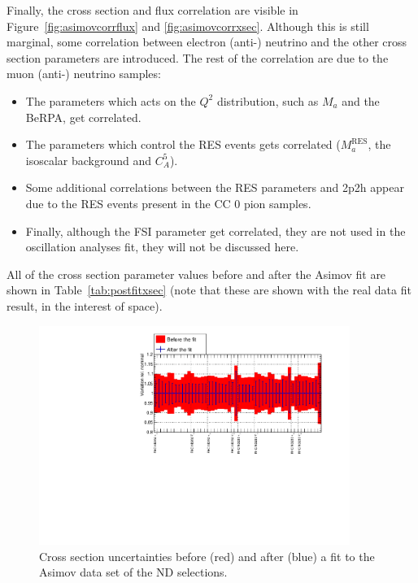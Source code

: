 Finally, the cross section and flux correlation are visible in
Figure~\ref{fig:asimovcorrflux} and \ref{fig:asimovcorrxsec}. Although
this is still marginal, some correlation between electron (anti-)
neutrino and the other cross section parameters are introduced. The
rest of the correlation are due to the muon (anti-) neutrino
samples:
\begin{itemize}[noitemsep,topsep=0pt]
\item The parameters which acts on the $Q^2$ distribution, such as
  $M_a$ and the \Gls{BeRPA}, get correlated.
\item The parameters which control the \Gls{RES} events gets
  correlated ($M_a^{\text{RES}}$, the isoscalar background and
  $C_A^5$).
\item Some additional correlations between the \Gls{RES} parameters
  and \Gls{2p2h} appear due to the \Gls{RES} events present in the
  \Gls{CC} 0 pion samples.
\item Finally, although the \Gls{FSI} parameter get correlated, they
  are not used in the oscillation analyses fit, they will not be
  discussed here.
\end{itemize}

All of the cross section parameter values before and after the
\Gls{Asimov} fit are shown in Table~\ref{tab:postfitxsec} (note that
these are shown with the real data fit result, in the interest of
space).

\begin{figure}[ht]
  \begin{center}
    \includegraphics[width=0.9\textwidth,page=3]{images/BANFF/OutputAsimov_histos.pdf}
    \caption[Cross section uncertainties before and after a fit to the
    Asimov data set of the ND selections]{Cross section uncertainties
      before (red) and after (blue) a fit to the \Gls{Asimov} data set
      of the \Gls{ND} selections.}
    \label{fig:asimovxsec}
  \end{center}
\end{figure}

